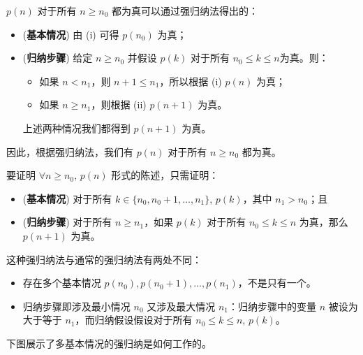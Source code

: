 \begin{cproof}
$p(n)$ 对于所有 $n \ge n_0$ 都为真可以通过强归纳法得出的：
\begin{itemize}
\item (\textbf{基本情况}) 由 (i) 可得 $p(n_0)$ 为真；
\item (\textbf{归纳步骤}) 给定 $n \ge n_0$ 并假设 $p(k)$ 对于所有 $n_0 \le k \le n$为真。则：
\begin{itemize}
\item 如果 $n < n_1$，则 $n+1 \le n_1$，所以根据 (i) $p(n)$ 为真；
\item 如果 $n \ge n_1$，则根据 (ii) $p(n+1)$ 为真。
\end{itemize}
上述两种情况我们都得到 $p(n+1)$ 为真。
\end{itemize}
因此，根据强归纳法，我们有 $p(n)$ 对于所有 $n \ge n_0$ 都为真。
\end{cproof}

\begin{strategy}[通过具有多基本情况的强归纳法证明]
要证明 $\forall n \ge n_0,\, p(n)$ 形式的陈述，只需证明：
\begin{itemize}
\item (\textbf{基本情况}) 对于所有 $k \in \{ n_0, n_0+1, \dots, n_1 \}$, $p(k)$，其中 $n_1 > n_0$；且
\item (\textbf{归纳步骤}) 对于所有 $n \ge n_1$，如果 $p(k)$ 对于所有 $n_0 \le k \le n$ 为真，那么 $p(n+1)$ 为真。
\end{itemize}
\end{strategy}

这种强归纳法与通常的强归纳法有两处不同：
\begin{itemize}
\item 存在多个基本情况 $p(n_0), p(n_0+1), \dots, p(n_1)$，不是只有一个。
\item 归纳步骤即涉及最小情况 $n_0$ 又涉及最大情况 $n_1$：归纳步骤中的变量 $n$ 被设为大于等于 $n_1$，而归纳假设假设对于所有 $n_0 \le k \le n$, $p(k)$。
\end{itemize}

下图展示了多基本情况的强归纳是如何工作的。

\begin{center}
\end{center}

